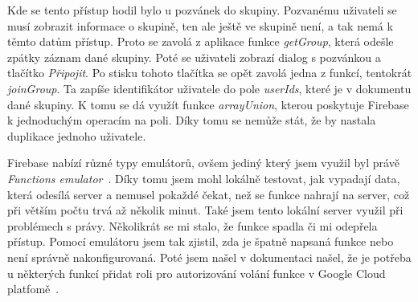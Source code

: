 Kde se tento přístup hodil bylo u pozvánek do skupiny. Pozvanému uživateli se musí zobrazit informace o skupině, ten ale ještě ve skupině není,
a tak nemá k těmto datům přístup. Proto se zavolá z aplikace funkce \emph{getGroup}, která odešle zpátky záznam dané skupiny. Poté se uživateli
zobrazí dialog s pozvánkou a tlačítko \emph{Připojit}. Po stisku tohoto tlačítka se opět zavolá jedna z funkcí, tentokrát \emph{joinGroup}. Ta
zapíše identifikátor uživatele do pole \emph{userIds}, které je v dokumentu dané skupiny. K tomu se dá využít funkce \emph{arrayUnion}, kterou poskytuje
Firebase k jednoduchým operacím na poli. Díky tomu se nemůže stát, že by nastala duplikace jednoho uživatele.

Firebase nabízí různé typy emulátorů, ovšem jediný který jsem využil byl právě \emph{Functions emulator}~\cite{FirebaseEmulator}. Díky tomu jsem mohl lokálně testovat, jak vypadají
data, která odesílá server a nemusel pokaždé čekat, než se funkce nahrají na server, což při větším počtu trvá až několik minut. Také jsem tento lokální server
využil při problémech s právy. Několikrát se mi stalo, že funkce spadla či mi odepřela přístup. Pomocí emulátoru jsem tak zjistil, zda je špatně napsaná funkce
nebo není správně nakonfigurovaná. Poté jsem našel v dokumentaci našel, že je potřeba u některých funkcí přidat roli pro autorizování volání funkce v Google
Cloud platfomě~\cite{CloudRights}.

